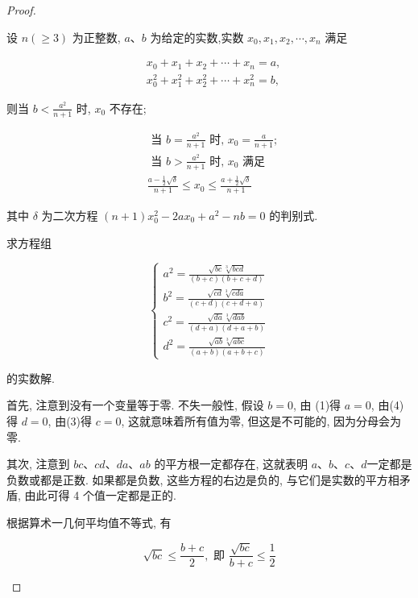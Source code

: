 \begin{proof}
\begin{example}
\begin{solution}
\begin{note}
	设 $n(\geqslant 3)$ 为正整数, $a 、 b$ 为给定的实数,实数 $x_{0}, x_{1}, x_{2}, \cdots, x_{n}$ 满足
	
	$$
	\begin{aligned}
	& x_{0}+x_{1}+x_{2}+\cdots+x_{n}=a, \\
	& x_{0}^{2}+x_{1}^{2}+x_{2}^{2}+\cdots+x_{n}^{2}=b,
	\end{aligned}
	$$
	
	则当 $b<\frac{a^{2}}{n+1}$ 时, $x_{0}$ 不存在;
	
	$$
	\begin{aligned}
	& \text { 当 } b=\frac{a^{2}}{n+1} \text { 时, } x_{0}=\frac{a}{n+1} \text {; } \\
	& \text { 当 } b>\frac{a^{2}}{n+1} \text { 时, } x_{0} \text { 满足 } \\
	& \frac{a-\frac{1}{2} \sqrt{\delta}}{n+1} \leqslant x_{0} \leqslant \frac{a+\frac{1}{2} \sqrt{\delta}}{n+1}
	\end{aligned}
	$$
	
	其中 $\delta$ 为二次方程 $(n+1) x_{0}^{2}-2 a x_{0}+a^{2}-n b=0$ 的判别式.
\end{note}

\begin{example}
	求方程组
	
	\[
	\left\{\begin{array}{l}
	a^{2}=\frac{\sqrt{b c} \sqrt[3]{b c d}}{(b+c)(b+c+d)}  \tag{1}\\
	b^{2}=\frac{\sqrt{c d} \sqrt[3]{c d a}}{(c+d)(c+d+a)} \\
	c^{2}=\frac{\sqrt{d a} \sqrt[3]{d a b}}{(d+a)(d+a+b)} \\
	d^{2}=\frac{\sqrt{a b} \sqrt[3]{a b c}}{(a+b)(a+b+c)}
	\end{array}\right.
	\]
	
	的实数解.
\end{example}
\begin{solution}
	首先, 注意到没有一个变量等于零. 不失一般性, 假设 $b=0$, 由 (1)得 $a=0$, 由(4)得 $d=0$, 由(3)得 $c=0$, 这就意味着所有值为零, 但这是不可能的, 因为分母会为零.
	
	其次, 注意到 $b c 、 c d 、 d a 、 a b$ 的平方根一定都存在, 这就表明 $a 、 b 、 c 、 d$一定都是负数或都是正数. 如果都是负数, 这些方程的右边是负的, 与它们是实数的平方相矛盾, 由此可得 4 个值一定都是正的.
	
	根据算术一几何平均值不等式, 有
	
	$$
	\sqrt{b c} \leqslant \frac{b+c}{2}, \text { 即 } \frac{\sqrt{b c}}{b+c} \leqslant \frac{1}{2}
	$$
	

\end{solution}
\end{solution}
\end{example}
\end{proof}
